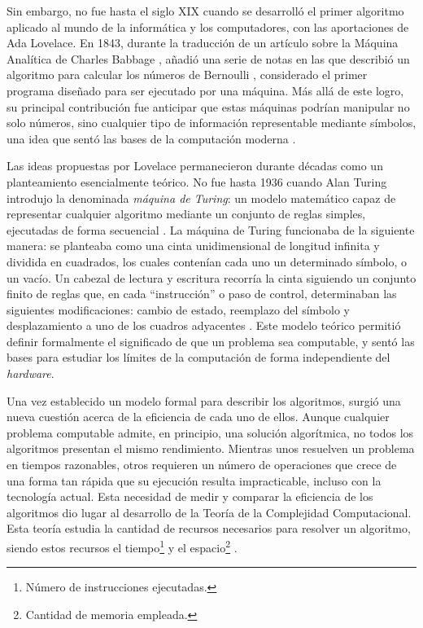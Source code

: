 Sin embargo, no fue hasta el siglo XIX cuando se desarrolló el primer algoritmo aplicado al mundo de la informática y los 
computadores, con las aportaciones de Ada Lovelace. En 1843, durante la traducción de un artículo sobre la Máquina Analítica
de Charles Babbage \cite{rojas2022}, añadió una serie de notas en las que describió un algoritmo para calcular los números de
Bernoulli \cite{weisstein}, considerado el primer programa diseñado para ser ejecutado por una máquina. Más allá de este logro,
su principal contribución fue anticipar que estas máquinas podrían manipular no solo números, sino cualquier tipo de información
representable mediante símbolos, una idea que sentó las bases de la computación moderna \cite{dasilva2019}.

Las ideas propuestas por Lovelace permanecieron durante décadas como un planteamiento esencialmente teórico. No fue hasta 1936 
cuando Alan Turing introdujo la denominada \textit{máquina de Turing}: un modelo matemático capaz de representar cualquier 
algoritmo mediante un conjunto de reglas simples, ejecutadas de forma secuencial \cite{demol2018}. La máquina de Turing
funcionaba de la siguiente manera: se planteaba como una cinta unidimensional de longitud infinita y dividida en cuadrados, los
cuales contenían cada uno un determinado símbolo, o un vacío. Un cabezal de lectura y escritura recorría la cinta siguiendo un 
conjunto finito de reglas que, en cada ``instrucción'' o paso de control, determinaban las siguientes modificaciones: cambio de
estado, reemplazo del símbolo y desplazamiento a uno de los cuadros adyacentes \cite{rico2021}. Este modelo teórico permitió
definir formalmente el significado de que un problema sea computable, y sentó las bases para estudiar los límites de la 
computación de forma independiente del \textit{hardware}.

Una vez establecido un modelo formal para describir los algoritmos, surgió una nueva cuestión acerca de la eficiencia de cada uno 
de ellos. Aunque cualquier problema computable admite, en principio, una solución algorítmica, no todos los algoritmos presentan 
el mismo rendimiento. Mientras unos resuelven un problema en tiempos razonables, otros requieren un número de operaciones que 
crece de una forma tan rápida que su ejecución resulta impracticable, incluso con la tecnología actual. Esta necesidad de medir 
y comparar la eficiencia de los algoritmos dio lugar al desarrollo de la Teoría de la Complejidad Computacional. Esta teoría 
estudia la cantidad de recursos necesarios para resolver un algoritmo, siendo estos recursos el tiempo\footnote{Número de 
instrucciones ejecutadas.} y el espacio\footnote{Cantidad de memoria empleada.} \cite{cortez2004}.

